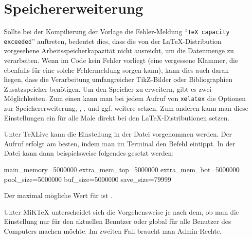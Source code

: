 \section{Speichererweiterung}%
%
\label{sec:Speichererweiterung}
%
Sollte bei der Kompilierung der Vorlage die Fehler-Meldung \enquote{\texttt{TeX capacity exceeded}} auftreten,
bedeutet dies, dass die von der \LaTeX-Distribution vorgesehene Arbeitsspeicherkapazität
nicht ausreicht, um die Datenmenge zu verarbeiten.
Wenn im Code kein Fehler vorliegt (\zB eine vergessene Klammer,
die ebenfalls für eine solche Fehlermeldung sorgen kann),
kann dies auch daran liegen, dass die Verarbeitung umfangreicher TikZ-Bilder oder Bibliographien 
Zusatzspeicher benötigen.
Um den Speicher zu erweitern, gibt es zwei Möglichkeiten.
Zum einen kann man bei jedem Aufruf von \texttt{xelatex} die Optionen zur Speichererweiterung,
\zB {}, ,  und ggf. weitere setzen.
Zum anderen kann man diese Einstellungen ein für alle Male direkt bei den LaTeX-Distributionen setzen.

Unter TeXLive kann die Einstellung in der Datei
 vorgenommen werden.
Der Aufruf erfolgt am besten, indem man im Terminal den Befehl  eintippt.
In der Datei kann dann beispielsweise folgendes gesetzt werden:
\begin{latex}[caption={[Einstellungen zur erweiterten Speichernutzung]Einstellungen zur erweiterten Speichernutzung in der Datei \printfilepathquoted{texmf.cnf} bei TeXLive bzw. \printfilepathquoted{xelatex.ini} bei MiKTeX},label={lst:Speichererweiterung}]
main_memory=5000000
extra_mem_top=5000000
extra_mem_bot=5000000
pool_size=5000000
buf_size=5000000
save_size=79999
\end{latex}
Der maximal mögliche Wert für  \etc ist .

Unter MiKTeX unterscheidet sich die Vorgehensweise je nach dem,
ob man die Einstellung nur für den aktuellen Benutzer oder
global für alle Benutzer des Computers machen möchte.
Im zweiten Fall braucht man Admin-Rechte.

